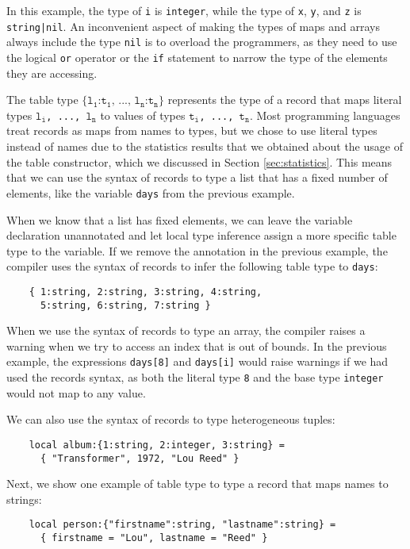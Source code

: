 In this example, the type of \texttt{i} is \texttt{integer},
while the type of \texttt{x}, \texttt{y}, and \texttt{z} is
\texttt{string|nil}.
An inconvenient aspect of making the types of maps and arrays always
include the type \texttt{nil} is to overload the programmers,
as they need to use the logical \texttt{or} operator or the \texttt{if}
statement to narrow the type of the elements they are accessing.

The table type
$\texttt{\{l}{_\texttt{1}}\texttt{:t}_{\texttt{1}}
\texttt{, ..., l}{_\texttt{n}}\texttt{:t}_{\texttt{n}}\texttt{\}}$
represents the type of a record that maps literal types
$\texttt{l}_{\texttt{i}}$\texttt{, ..., }$\texttt{l}_{\texttt{n}}$
to values of types $\texttt{t}_{\texttt{i}}$\texttt{, ..., }$\texttt{t}_{\texttt{n}}$.
Most programming languages treat records as maps from names
to types, but we chose to use literal types instead of
names due to the statistics results that we obtained about
the usage of the table constructor, which we discussed in
Section \ref{sec:statistics}.
This means that we can use the syntax of records to type a
list that has a fixed number of elements,
like the variable \texttt{days} from the previous example.

When we know that a list has fixed elements, we can leave the
variable declaration unannotated and let local type inference assign
a more specific table type to the variable.
If we remove the annotation in the previous example, the compiler uses the
syntax of records to infer the following table type to \texttt{days}:
\begin{verbatim}
    { 1:string, 2:string, 3:string, 4:string,
      5:string, 6:string, 7:string }
\end{verbatim}

When we use the syntax of records to type an array, the compiler
raises a warning when we try to access an index that is out of bounds.
In the previous example, the expressions \texttt{days[8]} and \texttt{days[i]}
would raise warnings if we had used the records syntax,
as both the literal type \texttt{8} and the base type
\texttt{integer} would not map to any value.

We can also use the syntax of records to type heterogeneous tuples:
\begin{verbatim}
    local album:{1:string, 2:integer, 3:string} =
      { "Transformer", 1972, "Lou Reed" }
\end{verbatim}

Next, we show one example of table type to type a record that maps
names to strings:
\begin{verbatim}
    local person:{"firstname":string, "lastname":string} =
      { firstname = "Lou", lastname = "Reed" } 
\end{verbatim}


